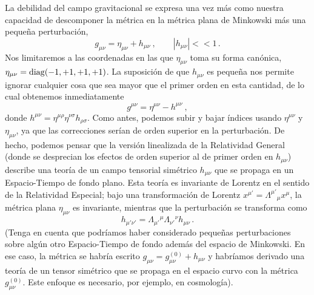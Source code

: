 \documentclass[11pt,b5paper,openany,twoside]{book}
\newcommand{\mn}{{\mu\nu}}
\begin{document}
La debilidad del campo gravitacional se expresa una vez más como nuestra capacidad de descomponer la métrica en la métrica plana de Minkowski más una pequeña perturbación,
\begin{equation}
g_\mn = \eta_\mn + h_\mn\ ,\qquad |h_\mn |<<1\,.\label{6.1}
\end{equation}
Nos limitaremos a las coordenadas en las que $\eta_\mn$ toma su forma canónica, $\eta_\mn = {\rm diag}(-1,+1,+1,+1)$.
La suposición de que $h_\mn$ es pequeña nos permite ignorar cualquier cosa que sea mayor que el primer orden en esta cantidad, de lo cual obtenemos inmediatamente
\begin{equation}
g^\mn = \eta^\mn - h^\mn\ ,\label{6.2}
\end{equation}
donde $h^\mn = \eta^{\mu\rho}\eta^{\nu\sigma}h_{\rho\sigma}$.
Como antes, podemos subir y bajar índices usando $\eta^\mn$ y $\eta_\mn$, ya que las correcciones serían de orden superior en la perturbación.
De hecho, podemos pensar que la versión linealizada de la Relatividad General (donde se desprecian los efectos de orden superior al de primer orden en $h_\mn$) describe una teoría de un campo tensorial simétrico $h_\mn$ que se propaga en un Espacio-Tiempo de fondo plano.
Esta teoría es invariante de Lorentz en el sentido de la Relatividad Especial; bajo una transformación de Lorentz $x^{\mu'} = \Lambda^{\mu'}{}_\mu x^\mu$, la métrica plana $\eta_\mn$ es invariante, mientras que la perturbación se transforma como
\begin{equation}
h_{\mu'\nu'}=\Lambda_{\mu'}{}^\mu \Lambda_{\nu'}{}^\nu h_\mn\,.
\label{6.3}
\end{equation}
(Tenga en cuenta que podríamos haber considerado pequeñas perturbaciones sobre algún otro Espacio-Tiempo de fondo además del espacio de Minkowski.
En ese caso, la métrica se habría escrito $g_\mn = g_\mn^{(0)}+h_\mn$ y habríamos derivado una teoría de un tensor simétrico que se propaga en el espacio curvo con la métrica $g_\mn^{(0)}$.
Este enfoque es necesario, por ejemplo, en cosmología).
\end{document}
